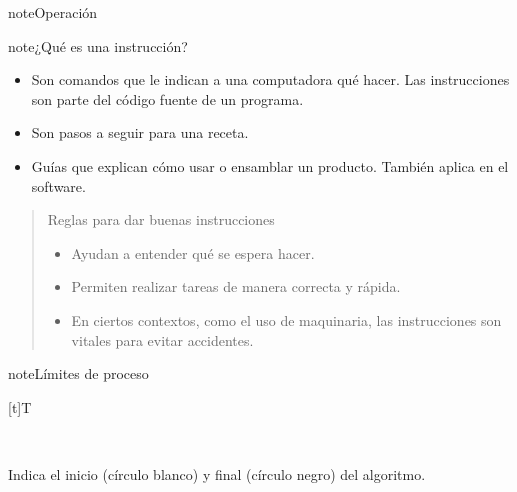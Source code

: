 \documentclass[letterpaper,10pt,spanish]{sphinxmanual}
\let\sphinxpxdimen\pdfpxdimen\else\newdimen\sphinxpxdimen
\begin{document}
\begin{sphinxadmonition}{note}{Operación}
\begin{sphinxadmonition}{note}{¿Qué es una instrucción?}
\begin{itemize}
\item {} 
\sphinxAtStartPar
{} Son comandos que le indican a una computadora qué hacer. Las instrucciones son parte del código fuente de un programa.

\item {} 
\sphinxAtStartPar
{} Son pasos a seguir para una receta.

\item {} 
\sphinxAtStartPar
{} Guías que explican cómo usar o ensamblar un producto. También aplica en el software.

\end{itemize}
\begin{quote}

\sphinxAtStartPar
Reglas para dar buenas instrucciones
\begin{itemize}
\item {} 
\sphinxAtStartPar
{} Ayudan a entender qué se espera hacer.

\item {} 
\sphinxAtStartPar
{} Permiten realizar tareas de manera correcta y rápida.

\item {} 
\sphinxAtStartPar
{} En ciertos contextos, como el uso de maquinaria, las instrucciones son vitales para evitar accidentes.

\end{itemize}
\end{quote}
\end{sphinxadmonition}
\end{sphinxadmonition}

\begin{sphinxadmonition}{note}{Límites de proceso}


\begin{savenotes}\sphinxattablestart
\sphinxthistablewithglobalstyle
\centering
\begin{tabulary}{\linewidth}[t]{T}
\sphinxtoprule
\sphinxtableatstartofbodyhook

\begin{sphinxfigure-in-table}
\centering
\capstart
\noindent\sphinxincludegraphics[width=250\sphinxpxdimen]{{image029}.png}
\label{\detokenize{1_guias/10programacion/G1023:id6}}\end{sphinxfigure-in-table}\relax
\\
\sphinxbottomrule
\end{tabulary}
\sphinxtableafterendhook\par
\sphinxattableend\end{savenotes}

\sphinxAtStartPar
Indica el inicio (círculo blanco) y final (círculo negro) del algoritmo.
\end{sphinxadmonition}
\end{document}
